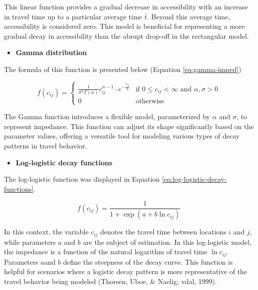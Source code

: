 \documentclass[
11pt, %
oneside, %
english, %
singlespacing, %
]{macthesis} %
\def\tightlist{}
\begin{document}
This linear function provides a gradual decrease in accessibility with an increase in travel time up to a particular average time \(\bar{t}\). Beyond this average time, accessibility is considered zero. This model is beneficial for representing a more gradual decay in accessibility than the abrupt drop-off in the rectangular model.

\begin{itemize}
\tightlist
\item
  \textbf{Gamma distribution}
\end{itemize}

The formula of this function is presented below (Equation \ref{eq:gamma-imped})

\begin{equation}
f(c_{ij}) = 
   \begin{cases}
\frac{1}{\sigma^\alpha\Gamma(\alpha)} c_{ij}^{\alpha-1} \cdot e^{-\frac{c_{ij}}{\sigma}} & \text{if } 0 \leq c_{ij} <      \infty  \text{ and } \alpha, \sigma > 0 \\
0 & \text{otherwise}
   \end{cases}
\label{eq:gamma-imped}
\end{equation}

The Gamma function introduces a flexible model, parameterized by \(\alpha\) and \(\sigma\), to represent impedance. This function can adjust its shape significantly based on the parameter values, offering a versatile tool for modeling various types of decay patterns in travel behavior.

\begin{itemize}
\tightlist
\item
  \textbf{Log-logistic decay functions}
\end{itemize}

The log-logistic function was displayed in Equation \ref{eq:log-logistic-decay-functions}.

\begin{equation}
f(c_{ij}) = \frac {1}{1+ \exp(a + b\ln c_{ij})}
\label{eq:log-logistic-decay-functions}
\end{equation}

In this context, the variable \(c_{ij}\) denotes the travel time between locations \(i\) and \(j\), while parameters \(a\) and \(b\) are the subject of estimation. In this log-logistic model, the impedance is a function of the natural logarithm of travel time \(\ln c_{ij}\). Parameters \(a\)and \(b\) define the steepness of the decay curve. This function is helpful for scenarios where a logistic decay pattern is more representative of the travel behavior being modeled (Thorsen, Uboe, \& Naelig; vdal, 1999).
\end{document}
